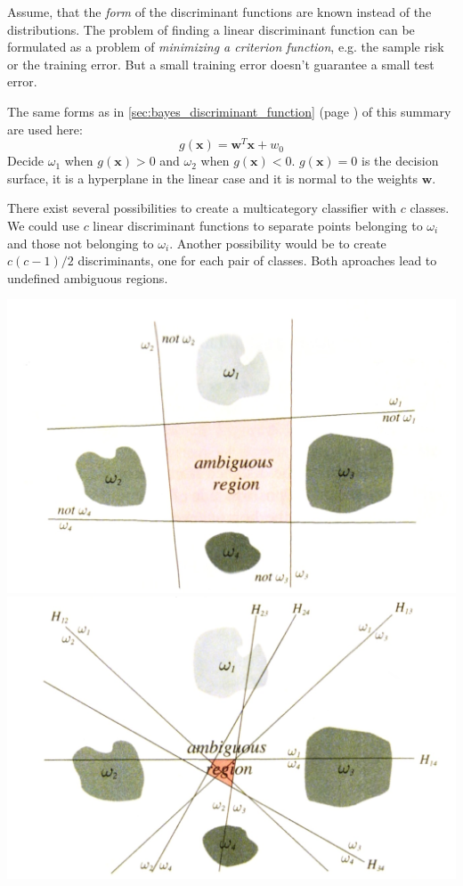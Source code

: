   Assume, that the \emph{form} of the discriminant functions are known instead of the
  distributions. The problem of finding a linear discriminant function can be formulated as a problem
  of \emph{minimizing a criterion function}, e.g. the sample risk or the training error.
  But a small training error doesn't guarantee a small test error.
  

      The same forms as in \ref{sec:bayes_discriminant_function} (page \pageref{sec:bayes_discriminant_function}) 
      of this summary are used here:
      $$g(\bm x) = \bm w ^T \bm x + w_0$$
      Decide $\omega_1$ when $g(\bm x) > 0$ and $\omega_2$ when $g(\bm x) < 0$. $g(\bm x) = 0$ is
      the decision surface, it is a hyperplane in the linear case and it is normal to the weights 
      $\bm w$.
      
    \begin{multicols}{2}
		There exist several possibilities to create a multicategory classifier with $c$ classes.
		We could use $c$ linear discriminant functions to separate points belonging 
		to $\omega_i$ and those not belonging to $\omega_i$.
		Another possibility would be to create $c(c-1)/2$ discriminants, one for each pair of classes.
		Both aproaches lead to undefined ambiguous regions.
	
		\includegraphics[width=0.5\linewidth]{images/onevsall.jpg}
		\includegraphics[width=0.5\linewidth]{images/onevsone.jpg}
    \end{multicols}
    
